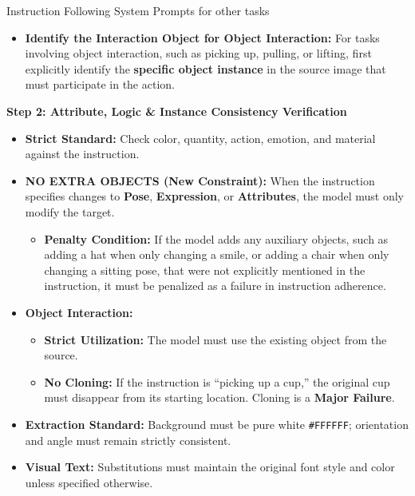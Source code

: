\begin{promptbox}[label={System Prompts: IF_other tasks}]{Instruction Following System Prompts for other tasks}
\begin{itemize}[leftmargin=2.2em, labelsep=0.4em, itemsep=2pt]
    \item \textbf{Identify the Interaction Object for Object Interaction:} For tasks involving object interaction, such as picking up, pulling, or lifting, first explicitly identify the \textbf{specific object instance} in the source image that must participate in the action.
\end{itemize}

\medskip

\textbf{Step 2: Attribute, Logic \& Instance Consistency Verification}

\begin{itemize}[leftmargin=2.2em, labelsep=0.4em, itemsep=2pt]
    \item \textbf{Strict Standard:} Check color, quantity, action, emotion, and material against the instruction.
    
    \item \textbf{NO EXTRA OBJECTS (New Constraint):} When the instruction specifies changes to \textbf{Pose}, \textbf{Expression}, or \textbf{Attributes}, the model must only modify the target.
    
    \begin{itemize}
        \item \textbf{Penalty Condition:} If the model adds any auxiliary objects, such as adding a hat when only changing a smile, or adding a chair when only changing a sitting pose, that were not explicitly mentioned in the instruction, it must be penalized as a failure in instruction adherence.
    \end{itemize}
    
    \item \textbf{Object Interaction:}
    
    \begin{itemize}
        \item \textbf{Strict Utilization:} The model must use the existing object from the source.
        \item \textbf{No Cloning:} If the instruction is ``picking up a cup,'' the original cup must disappear from its starting location. Cloning is a \textbf{Major Failure}.
    \end{itemize}
    
    \item \textbf{Extraction Standard:} Background must be pure white \texttt{\#FFFFFF}; orientation and angle must remain strictly consistent.
    
    \item \textbf{Visual Text:} Substitutions must maintain the original font style and color unless specified otherwise.
\end{itemize}


\end{promptbox}
